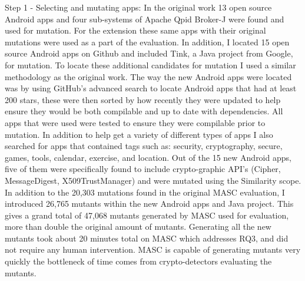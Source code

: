 Step 1 - Selecting and mutating apps: In the original work 13 open source Android apps and four sub-systems of Apache Qpid Broker-J were found and used for mutation. For the extension these same apps with their original mutations were used as a part of the evaluation. In addition, I located 15 open source Android apps on Github and included Tink, a Java project from Google, for mutation. To locate these additional candidates for mutation I used a similar methodology as the original work. The way the new Android apps were located was by using GitHub's advanced search to locate Android apps that had at least 200 stars, these were then sorted by how recently they were updated to help ensure they would be both compilable and up to date with dependencies. All apps that were used were tested to ensure they were compilable prior to mutation. In addition to help get a variety of different types of apps I also searched for apps that contained tags such as: security, cryptography, secure, games, tools, calendar, exercise, and location. Out of the 15 new Android apps, five of them were specifically found to include crypto-graphic API's (Cipher, MessageDigest, X509TrustManager) and were mutated using the Similarity scope. In addition to the 20,303 mutations found in the original MASC evaluation, I introduced 26,765 mutants within the new Android apps and Java project. This gives a grand total of 47,068 mutants generated by MASC used for evaluation, more than double the original amount of mutants. Generating all the new mutants took about 20 minutes total on MASC which addresses RQ3, and did not require any human intervention. MASC is capable of generating mutants very quickly the bottleneck of time comes from crypto-detectors evaluating the mutants.

